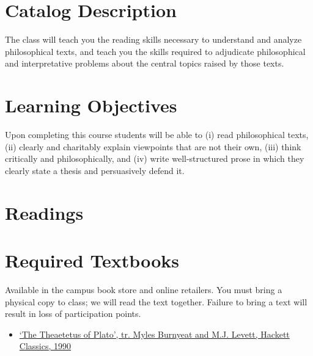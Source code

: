 \documentclass[article,oneside]{memoir}
\begin{document}
\section{Catalog Description}
The class will teach you the reading skills necessary to understand and analyze philosophical texts, and teach you the skills required to adjudicate philosophical and interpretative problems about the central topics raised by those texts.
 

\section{Learning Objectives}

Upon completing this course students will be able to (i) read
philosophical texts, (ii) clearly and charitably explain viewpoints that
are not their own, (iii) think critically and philosophically, and (iv)
write well-structured prose in which they clearly state a thesis and
persuasively defend it.


\section{Readings}
\section{Required Textbooks}

Available in the campus book store and online retailers. You must bring a physical copy to class; we will read the text together. Failure to bring a text will result in loss of participation points. 

\begin{itemize}
\item \href{https://www.amazon.com/Theaetetus-Plato-Hackett-Classics/dp/0915144816/ref=sr_1_2?s=books&ie=UTF8&qid=1533665731&sr=1-2}{`The Theaetetus of Plato', tr. Myles Burnyeat and M.J. Levett, Hackett Classics, 1990}
\end{itemize}
\end{document}

